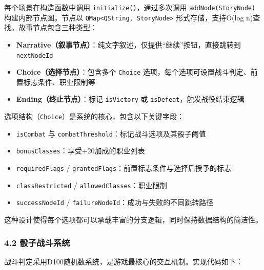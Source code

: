每个场景在构造函数中调用 \texttt{initialize()}，通过多次调用
\texttt{addNode(StoryNode)} 构建内部节点图。节点以
\texttt{QMap\textless{}QString,\ StoryNode\textgreater{}}
形式存储，支持O(log n)查找。故事节点包含三种类型：

\begin{itemize}
\tightlist
\item
  \textbf{Narrative（叙事节点）}：纯文字叙述，仅提供``继续''按钮，直接跳转到
  \texttt{nextNodeId}
\item
  \textbf{Choice（选择节点）}：包含多个 \texttt{Choice}
  选项，每个选项可设置战斗判定、前置标志条件、职业限制等
\item
  \textbf{Ending（终止节点）}：标记 \texttt{isVictory} 或
  \texttt{isDefeat}，触发战役结束逻辑
\end{itemize}

选项结构（\texttt{Choice}）是系统的核心，包含以下关键字段：

\begin{itemize}
\tightlist
\item
  \texttt{isCombat} 与
  \texttt{combatThreshold}：标记战斗选项及其骰子阈值
\item
  \texttt{bonusClasses}：享受+20加成的职业列表
\item
  \texttt{requiredFlags} /
  \texttt{grantedFlags}：前置标志条件与选择后授予的标志
\item
  \texttt{classRestricted} / \texttt{allowedClasses}：职业限制
\item
  \texttt{successNodeId} /
  \texttt{failureNodeId}：成功与失败的不同跳转路径
\end{itemize}

这种设计使得每个选项都可以承载丰富的分支逻辑，同时保持数据结构的简洁性。

\hypertarget{ux9ab0ux5b50ux6218ux6597ux7cfbux7edf}{%
\subsubsection{4.2
骰子战斗系统}\label{ux9ab0ux5b50ux6218ux6597ux7cfbux7edf}}

战斗判定采用D100随机数系统，是游戏最核心的交互机制。实现代码如下：

